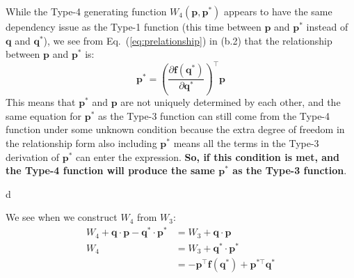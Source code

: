 \documentclass[titlepage]{article}
\begin{document}
\begin{mdframed}[linewidth=1pt, innertopmargin=10pt, innerbottommargin=10pt]
	While the Type-4 generating function $W_4(\boldsymbol{p},\boldsymbol{p}^*)$ appears to have the same dependency issue as the Type-1 function (this time between $\boldsymbol{p}$ and $\boldsymbol{p}^*$ instead of $\boldsymbol{q}$ and $\boldsymbol{q}^*$), we see from Eq.~(\ref{eq:prelationship}) in (b.2) that the relationship between $\boldsymbol{p}$ and $\boldsymbol{p}^*$ is:
	\begin{equation}
		\boldsymbol{p}^*=\left(\frac{\partial\boldsymbol{f}(\boldsymbol{q}^*)}{\partial\boldsymbol{q}^*}\right)^\top\boldsymbol{p}
	\end{equation}
	This means that $\boldsymbol{p}^*$ and $\boldsymbol{p}$ are not uniquely determined by each other, and the same equation for $\boldsymbol{p}^*$ as the Type-3 function can still come from the Type-4 function under some unknown condition because the extra degree of freedom in the relationship form also including $\boldsymbol{p}^*$ means all the terms in the Type-3 derivation of $\boldsymbol{p}^*$ can enter the expression. \textbf{So, if this condition is met, and the Type-4 function will produce the same $\boldsymbol{p}^*$ as the Type-3 function}.
\end{mdframed}d

We see when we construct $W_4$ from $W_3$:
\begin{equation}
	\begin{split}
		W_4+\boldsymbol{q}\cdot\boldsymbol{p}-\boldsymbol{q}^*\cdot\boldsymbol{p}^*&=W_3+\boldsymbol{q}\cdot\boldsymbol{p} \\
		W_4&=W_3+\boldsymbol{q}^*\cdot\boldsymbol{p}^* \\
		&=-\boldsymbol{p}^\top\boldsymbol{f}(\boldsymbol{q}^*)+\boldsymbol{p}^{*\top}\boldsymbol{q}^*
	\end{split}
\end{equation}
\end{document}
